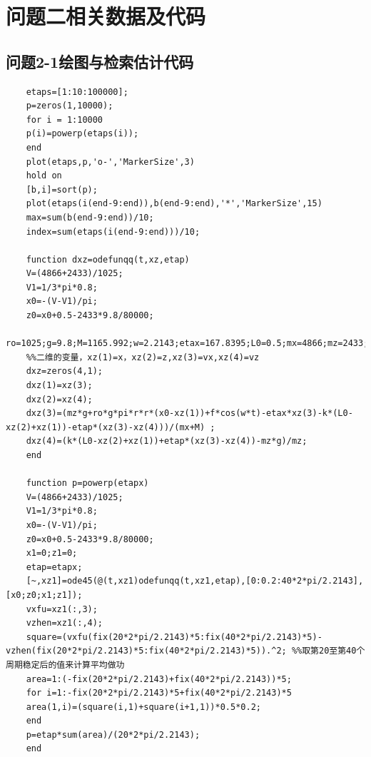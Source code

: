 \documentclass{article}
\numberwithin{equation}{subsection}
\begin{document}
\section{问题二相关数据及代码}
\subsection{问题2-1绘图与检索估计代码}
\begin{lstlisting}
    etaps=[1:10:100000];
    p=zeros(1,10000);
    for i = 1:10000
    p(i)=powerp(etaps(i));
    end
    plot(etaps,p,'o-','MarkerSize',3)
    hold on
    [b,i]=sort(p);
    plot(etaps(i(end-9:end)),b(end-9:end),'*','MarkerSize',15)
    max=sum(b(end-9:end))/10;
    index=sum(etaps(i(end-9:end)))/10;

    function dxz=odefunqq(t,xz,etap)
    V=(4866+2433)/1025; 
    V1=1/3*pi*0.8; 
    x0=-(V-V1)/pi;
    z0=x0+0.5-2433*9.8/80000;
    ro=1025;g=9.8;M=1165.992;w=2.2143;etax=167.8395;L0=0.5;mx=4866;mz=2433;r=1;f=4890;k=80000;
    %%二维的变量，xz(1)=x，xz(2)=z,xz(3)=vx,xz(4)=vz 
    dxz=zeros(4,1); 
    dxz(1)=xz(3); 
    dxz(2)=xz(4);
    dxz(3)=(mz*g+ro*g*pi*r*r*(x0-xz(1))+f*cos(w*t)-etax*xz(3)-k*(L0-xz(2)+xz(1))-etap*(xz(3)-xz(4)))/(mx+M) ;
    dxz(4)=(k*(L0-xz(2)+xz(1))+etap*(xz(3)-xz(4))-mz*g)/mz; 
    end

    function p=powerp(etapx)
    V=(4866+2433)/1025;
    V1=1/3*pi*0.8;
    x0=-(V-V1)/pi;
    z0=x0+0.5-2433*9.8/80000;
    x1=0;z1=0;
    etap=etapx;
    [~,xz1]=ode45(@(t,xz1)odefunqq(t,xz1,etap),[0:0.2:40*2*pi/2.2143],[x0;z0;x1;z1]);
    vxfu=xz1(:,3);
    vzhen=xz1(:,4);
    square=(vxfu(fix(20*2*pi/2.2143)*5:fix(40*2*pi/2.2143)*5)-vzhen(fix(20*2*pi/2.2143)*5:fix(40*2*pi/2.2143)*5)).^2; %%取第20至第40个周期稳定后的值来计算平均做功
    area=1:(-fix(20*2*pi/2.2143)+fix(40*2*pi/2.2143))*5;
    for i=1:-fix(20*2*pi/2.2143)*5+fix(40*2*pi/2.2143)*5
    area(1,i)=(square(i,1)+square(i+1,1))*0.5*0.2;
    end
    p=etap*sum(area)/(20*2*pi/2.2143);
    end
\end{lstlisting}
\end{document}
